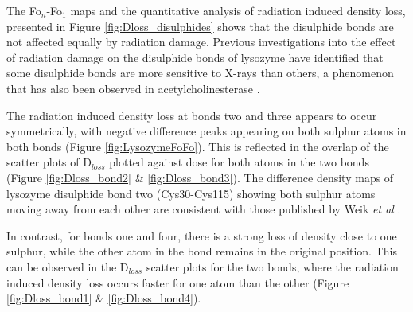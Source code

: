 The Fo$_n$-Fo$_1$ maps and the quantitative analysis of radiation induced density loss, presented in Figure \ref{fig:Dloss_disulphides} shows that the disulphide bonds are not affected equally by radiation damage. Previous investigations into the effect of radiation damage on the disulphide bonds of lysozyme have identified that some disulphide bonds are more sensitive to X-rays than others, a phenomenon that has also been observed in acetylcholinesterase \cite{Weik2000,Ravelli2000}. %

The radiation induced density loss at bonds two and three appears to occur symmetrically, with negative difference peaks appearing on both sulphur atoms in both bonds (Figure \ref{fig:LysozymeFoFo}). This is reflected in the overlap of the scatter plots of D$_{loss}$ plotted against dose for both atoms in the two bonds (Figure \ref{fig:Dloss_bond2} \& \ref{fig:Dloss_bond3}). The difference density maps of lysozyme disulphide bond two (Cys30-Cys115) showing both sulphur atoms moving away from each other are consistent with those published by Weik \textit{et al} \cite{Weik2000}.

In contrast, for bonds one and four, there is a strong loss of density close to one sulphur, while the other atom in the bond remains in the original position. This can be observed in the D$_{loss}$ scatter plots for the two bonds, where the radiation induced density loss occurs faster for one atom than the other (Figure \ref{fig:Dloss_bond1} \& \ref{fig:Dloss_bond4}).         

